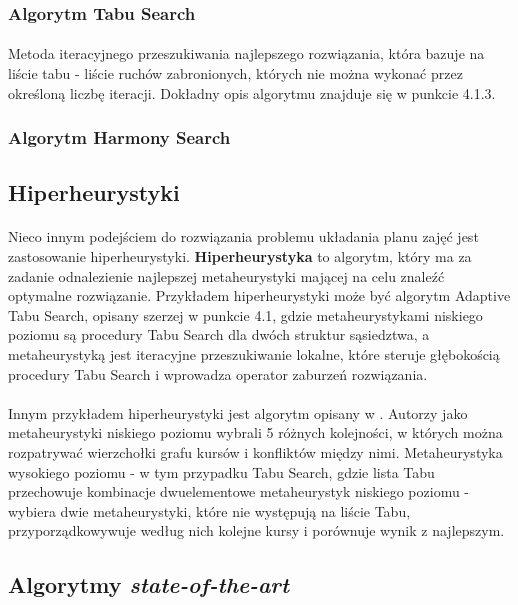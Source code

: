 \subsubsection{Algorytm Tabu Search}
\paragraph{} Metoda iteracyjnego przeszukiwania najlepszego rozwiązania, która bazuje na liście tabu - liście ruchów zabronionych, których nie można wykonać przez określoną liczbę iteracji. Dokładny opis algorytmu znajduje się w punkcie 4.1.3.
\subsubsection{Algorytm Harmony Search}


\subsection{Hiperheurystyki}
\paragraph{}Nieco innym podejściem do rozwiązania problemu układania planu zajęć jest zastosowanie hiperheurystyki. \textbf{Hiperheurystyka} to algorytm, który ma za zadanie odnalezienie najlepszej metaheurystyki mającej na celu znaleźć optymalne rozwiązanie. Przykładem hiperheurystyki może być algorytm Adaptive Tabu Search, opisany szerzej w punkcie 4.1, gdzie metaheurystykami niskiego poziomu są procedury Tabu Search dla dwóch struktur sąsiedztwa, a metaheurystyką jest iteracyjne przeszukiwanie lokalne, które steruje głębokością procedury Tabu Search i wprowadza operator zaburzeń rozwiązania.
\paragraph{}Innym przykładem hiperheurystyki jest algorytm opisany w \cite{gbhh}. Autorzy jako metaheurystyki niskiego poziomu wybrali 5 różnych kolejności, w których można rozpatrywać wierzchołki grafu kursów i konfliktów między nimi. Metaheurystyka wysokiego poziomu - w tym przypadku Tabu Search, gdzie lista Tabu przechowuje kombinacje dwuelementowe metaheurystyk niskiego poziomu - wybiera dwie metaheurystyki, które nie występują na liście Tabu, przyporządkowywuje według nich kolejne kursy i porównuje wynik z najlepszym.

\subsection{Algorytmy \textit{state-of-the-art}}

